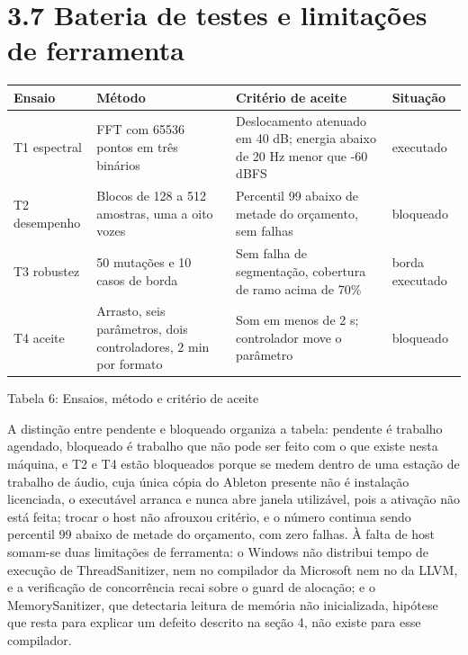 \documentclass[11pt,a4paper]{article}
\begin{document}
\section*{3.7 Bateria de testes e limitações de ferramenta}

\begin{center}
\scriptsize
\setlength{\tabcolsep}{4pt}
\begin{tabular}{p{}|p{}|p{}|p{}}
\hline
\textbf{Ensaio} & \textbf{Método} & \textbf{Critério de aceite} & \textbf{Situação} \\
\hline
T1 espectral & FFT com 65536 pontos em três binários & Deslocamento atenuado em 40 dB; energia abaixo de 20 Hz menor que -60 dBFS & executado \\
T2 desempenho & Blocos de 128 a 512 amostras, uma a oito vozes & Percentil 99 abaixo de metade do orçamento, sem falhas & bloqueado \\
T3 robustez & 50 mutações e 10 casos de borda & Sem falha de segmentação, cobertura de ramo acima de 70\% & borda executado \\
T4 aceite & Arrasto, seis parâmetros, dois controladores, 2 min por formato & Som em menos de 2 s; controlador move o parâmetro & bloqueado \\
\hline
\end{tabular}
\end{center}
\noindent Tabela 6: Ensaios, método e critério de aceite\par
\label{tab:6}
\vspace{2pt}{\footnotesize\noindent Autores\par}

A distinção entre pendente e bloqueado organiza a tabela: pendente é trabalho agendado, bloqueado é trabalho que não pode ser feito com o que existe nesta máquina, e T2 e T4 estão bloqueados porque se medem dentro de uma estação de trabalho de áudio, cuja única cópia do Ableton presente não é instalação licenciada, o executável arranca e nunca abre janela utilizável, pois a ativação não está feita; trocar o host não afrouxou critério, e o número continua sendo percentil 99 abaixo de metade do orçamento, com zero falhas. À falta de host somam-se duas limitações de ferramenta: o Windows não distribui tempo de execução de ThreadSanitizer, nem no compilador da Microsoft nem no da LLVM, e a verificação de concorrência recai sobre o guard de alocação; e o MemorySanitizer, que detectaria leitura de memória não inicializada, hipótese que resta para explicar um defeito descrito na seção 4, não existe para esse compilador.
\end{document}
